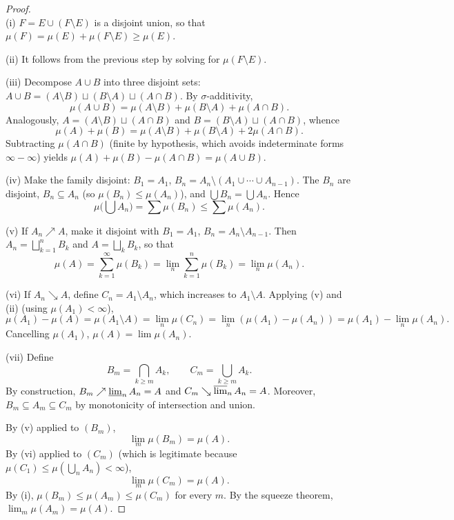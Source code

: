 \documentclass[11pt, a4paper]{article}
\begin{document}
\begin{proof}\leavevmode\\
(i) $F = E \cup (F \setminus E)$ is a disjoint union, so that
$\mu(F) = \mu(E) + \mu(F \setminus E)
\ge \mu(E)$.

(ii) It follows from the previous step by solving for $\mu(F \setminus E)$.

(iii) Decompose $A \cup B$ into three disjoint sets: $A \cup B = (A \setminus B) \sqcup
(B \setminus A) \sqcup (A \cap B)$. By $\sigma$-additivity,
$$ \mu(A \cup B) = \mu(A \setminus B) + \mu(B \setminus A) + \mu(A \cap B). $$
Analogously, $A = (A \setminus B) \sqcup (A \cap B)$ and $B = (B \setminus A) \sqcup
(A \cap B)$, whence
$$ \mu(A) + \mu(B) = \mu(A \setminus B) + \mu(B \setminus A) + 2 \mu(A \cap B). $$
Subtracting $\mu(A \cap B)$ (finite by hypothesis, which avoids indeterminate forms $\infty - \infty$)
yields $\mu(A) + \mu(B) - \mu(A \cap B) = \mu(A \cup B)$.

(iv) Make the family disjoint: $B_1 = A_1$, $B_n = A_n \setminus (A_1 \cup \cdots \cup A_{n-1})$. The $B_n$ are
disjoint, $B_n \subseteq A_n$ (so $\mu(B_n) \le \mu(A_n)$), and $\bigcup B_n = \bigcup A_n$. Hence
$$ \mu\!\Big(\!\bigcup A_n\Big) = \sum \mu(B_n) \le \sum \mu(A_n). $$

(v) If $A_n \nearrow A$, make it disjoint with $B_1 = A_1$, $B_n = A_n \setminus A_{n-1}$.
Then $A_n = \bigsqcup_{k=1}^n B_k$ and $A = \bigsqcup_k B_k$, so that
$$ \mu(A) = \sum_{k=1}^\infty \mu(B_k) = \lim_n \sum_{k=1}^n \mu(B_k) = \lim_n \mu(A_n). $$

(vi) If $A_n \searrow A$, define $C_n = A_1 \setminus A_n$, which increases to $A_1 \setminus A$.
Applying (v) and (ii) (using $\mu(A_1) < \infty$),
$$ \mu(A_1) - \mu(A) = \mu(A_1 \setminus A) = \lim_n \mu(C_n) = \lim_n (\mu(A_1) - \mu(A_n)) =
\mu(A_1) - \lim_n \mu(A_n). $$
Cancelling $\mu(A_1)$, $\mu(A) = \lim \mu(A_n)$.

(vii) Define
$$ B_m = \bigcap_{k \ge m} A_k, \qquad C_m = \bigcup_{k \ge m} A_k. $$
By construction, $B_m \nearrow \varliminf_n A_n = A$ and $C_m \searrow \varlimsup_n A_n = A$.
Moreover, $B_m \subseteq A_m \subseteq C_m$ by monotonicity of intersection and union.

By (v) applied to $(B_m)$,
$$ \lim_m \mu(B_m) = \mu(A). $$
By (vi) applied to $(C_m)$ (which is legitimate because $\mu(C_1) \le \mu(\bigcup_n A_n) < \infty$),
$$ \lim_m \mu(C_m) = \mu(A). $$
By (i), $\mu(B_m) \le \mu(A_m) \le \mu(C_m)$ for every $m$. By the squeeze
theorem, $\lim_m \mu(A_m) = \mu(A)$.
\end{proof}
\end{document}
